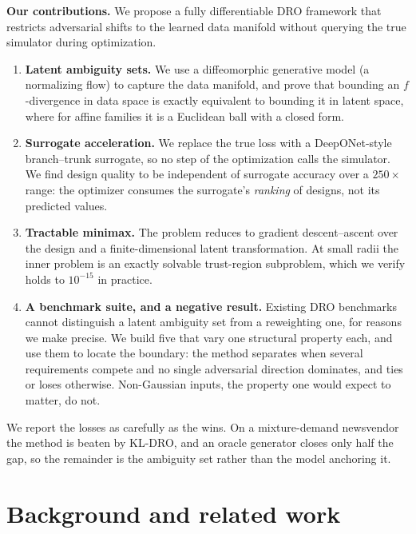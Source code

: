 \documentclass[11pt]{article}
\begin{document}
\textbf{Our contributions.} We propose a fully differentiable DRO framework that restricts adversarial shifts to the learned data manifold without querying the true simulator during optimization.
\begin{enumerate}
    \item \textbf{Latent ambiguity sets.} We use a diffeomorphic generative model (a normalizing flow) to capture the data manifold, and prove that bounding an $f$-divergence in data space is exactly equivalent to bounding it in latent space, where for affine families it is a Euclidean ball with a closed form.
    \item \textbf{Surrogate acceleration.} We replace the true loss with a DeepONet-style \citep{lu2021} branch--trunk surrogate, so no step of the optimization calls the simulator. We find design quality to be independent of surrogate accuracy over a $250\times$ range: the optimizer consumes the surrogate's \emph{ranking} of designs, not its predicted values.
    \item \textbf{Tractable minimax.} The problem reduces to gradient descent--ascent over the design and a finite-dimensional latent transformation. At small radii the inner problem is an exactly solvable trust-region subproblem, which we verify holds to $10^{-15}$ in practice.
    \item \textbf{A benchmark suite, and a negative result.} Existing DRO benchmarks cannot distinguish a latent ambiguity set from a reweighting one, for reasons we make precise. We build five that vary one structural property each, and use them to locate the boundary: the method separates when several requirements compete and no single adversarial direction dominates, and ties or loses otherwise. Non-Gaussian inputs, the property one would expect to matter, do not.
\end{enumerate}

We report the losses as carefully as the wins. On a mixture-demand newsvendor the method is beaten by KL-DRO, and an oracle generator closes only half the gap, so the remainder is the ambiguity set rather than the model anchoring it.


\section{Background and related work}
\label{sec:background}
\end{document}
